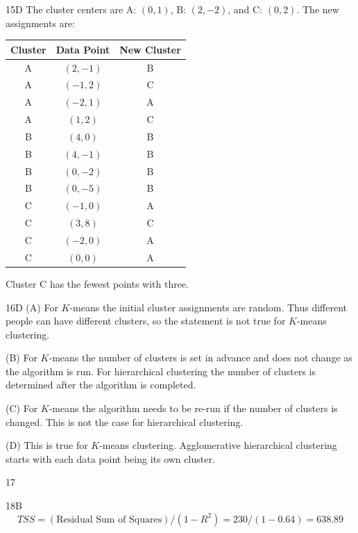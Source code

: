 \begin{solution}{15}{D}
The cluster centers are A: $(0, 1)$, B: $(2, -2)$, and C: $(0, 2)$. The new assignments are:
\begin{center}
\begin{tabular}{|c|c|c|}
\hline
Cluster & Data Point & New Cluster \\ \hline
A & $(2, -1)$ & B \\ \hline
A & $(-1, 2)$ & C \\ \hline
A & $(-2, 1)$ & A \\ \hline
A & $(1, 2)$ & C \\ \hline
B & $(4, 0)$ & B \\ \hline
B & $(4, -1)$ & B \\ \hline
B & $(0, -2)$ & B \\ \hline
B & $(0, -5)$ & B \\ \hline
C & $(-1, 0)$ & A \\ \hline
C & $(3, 8)$ & C \\ \hline
C & $(-2, 0)$ & A \\ \hline
C & $(0, 0)$ & A \\ \hline
\end{tabular}
\end{center}

Cluster C has the fewest points with three.
\end{solution}

\begin{solution}{16}{D}
(A) For $K$-means the initial cluster assignments are random. Thus different people can have different clusters, so the statement is not true for $K$-means clustering.

(B) For $K$-means the number of clusters is set in advance and does not change as the algorithm is run. For hierarchical clustering the number of clusters is determined after the algorithm is completed.

(C) For $K$-means the algorithm needs to be re-run if the number of clusters is changed. This is not the case for hierarchical clustering.

(D) This is true for $K$-means clustering. Agglomerative hierarchical clustering starts with each data point being its own cluster.
\end{solution}

\begin{solution}{17}{}
\deleted
\end{solution}

\begin{solution}{18}{B}
\[ TSS = (\text{Residual Sum of Squares})/(1 - R^2) = 230/(1 - 0.64) = 638.89 \]
\end{solution}

